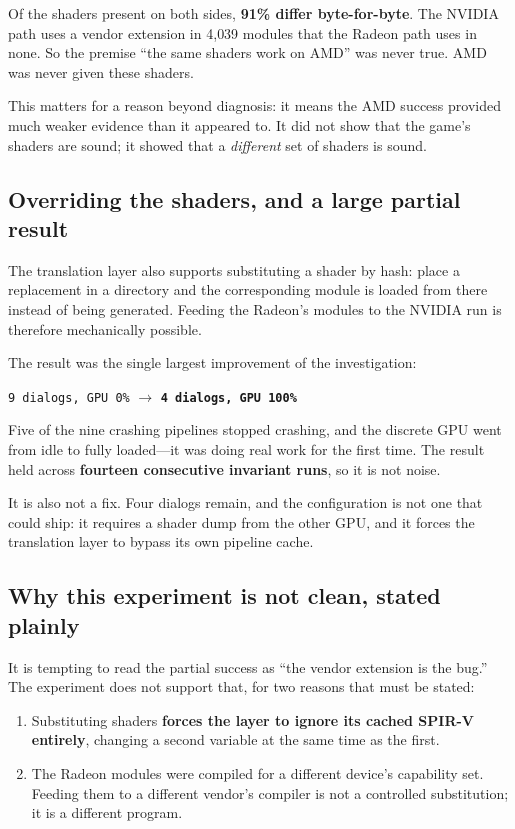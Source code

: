 Of the shaders present on both sides, \textbf{91\% differ byte-for-byte}. The
NVIDIA path uses a vendor extension in 4{,}039 modules that the Radeon path uses
in none. So the premise ``the same shaders work on AMD'' was never true. AMD was
never given these shaders.

This matters for a reason beyond diagnosis: it means the AMD success provided
much weaker evidence than it appeared to. It did not show that the game's shaders
are sound; it showed that a \emph{different} set of shaders is sound.

\subsection{Overriding the shaders, and a large partial result}

The translation layer also supports substituting a shader by hash: place a
replacement in a directory and the corresponding module is loaded from there
instead of being generated. Feeding the Radeon's modules to the NVIDIA run is
therefore mechanically possible.

The result was the single largest improvement of the investigation:

\begin{center}
\texttt{9 dialogs, GPU 0\%} $\longrightarrow$
\textbf{\texttt{4 dialogs, GPU 100\%}}
\end{center}

Five of the nine crashing pipelines stopped crashing, and the discrete GPU went
from idle to fully loaded---it was doing real work for the first time. The result
held across \textbf{fourteen consecutive invariant runs}, so it is not noise.

It is also not a fix. Four dialogs remain, and the configuration is not one that
could ship: it requires a shader dump from the other GPU, and it forces the
translation layer to bypass its own pipeline cache.

\subsection{Why this experiment is not clean, stated plainly}

It is tempting to read the partial success as ``the vendor extension is the
bug.'' The experiment does not support that, for two reasons that must be stated:

\begin{enumerate}
\item Substituting shaders \textbf{forces the layer to ignore its cached SPIR-V
      entirely}, changing a second variable at the same time as the first.
\item The Radeon modules were compiled for a different device's capability set.
      Feeding them to a different vendor's compiler is not a controlled
      substitution; it is a different program.
\end{enumerate}

